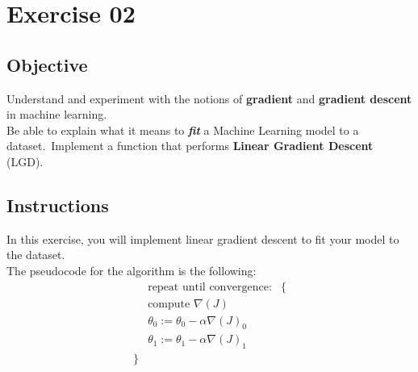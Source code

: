 \chapter{Exercise 02}

\newpage
{}
\makeheaderfilesforbidden

\section*{Objective}
Understand and experiment with the notions of \textbf{gradient} and \textbf{gradient descent} in machine learning.\\
\newline
Be able to explain what it means to \textbf{\textit{fit}} a Machine Learning model to a dataset.\
Implement a function that performs \textbf{Linear Gradient Descent} (LGD).


\section*{Instructions}
In this exercise, you will implement linear gradient descent to fit your model to the dataset.\\
\newline
The pseudocode for the algorithm is the following:
$$
\begin{matrix}
&\text{repeat until convergence:} & \{ \\
&	\text{compute } \nabla{(J)}  \\
&	\theta_0 := \theta_0 - \alpha \nabla(J)_0  \\
&	\theta_1 := \theta_1 - \alpha \nabla(J)_1\\
	\}
\end{matrix}
$$

